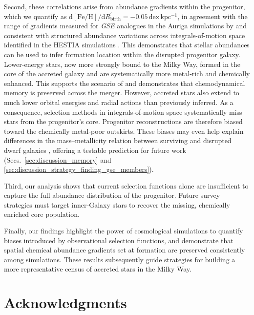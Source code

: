 \documentclass[fleqn,usenatbib]{mnras}
\newcommand{\changed}[1]{{{#1}}}
\begin{document}
Second, these correlations arise from abundance gradients within the progenitor\changed{, which we quantify as
$\mathrm{d[Fe/H]}/\mathrm{d}R_\mathrm{birth}^\prime = -0.05\,\mathrm{dex\,kpc^{-1}}$,
in agreement with the range of gradients measured for \textit{GSE} analogues in the Auriga simulations by \citet{Carrillo2026} and consistent with structured abundance variations across integrals-of-motion space identified in the HESTIA simulations \citet{Khoperskov2023d, Khoperskov2023c}. This demonstrates that stellar abundances can be used to infer formation location within the disrupted progenitor galaxy.} 
Lower-energy stars, now more strongly bound to the Milky Way, formed in the core of the accreted galaxy and are systematically more metal-rich and chemically enhanced. This supports the scenario of \citet{Skuladottir2025} and demonstrates that chemodynamical memory is preserved across the merger. However, accreted stars also extend to much lower orbital energies and radial actions than previously inferred. As a consequence, selection methods in integrals-of-motion space \citep{Helmi2018, Feuillet2021, Monty2024} systematically miss stars from the progenitor’s core. Progenitor reconstructions are therefore biased toward the chemically metal-poor outskirts. These biases may even help explain differences in the mass–metallicity relation between surviving and disrupted dwarf galaxies \citep{Naidu2022}, offering a testable prediction for future work (Secs.~\ref{sec:discussion_memory} and \ref{sec:discussion_strategy_finding_gse_members}).

Third, our analysis shows that current selection functions alone are insufficient to capture the full abundance distribution of the progenitor. Future survey strategies must target inner-Galaxy stars to recover the missing, chemically enriched core population.

Finally, our findings highlight the power of cosmological simulations to quantify biases introduced by observational selection functions, and \changed{demonstrate that spatial chemical abundance gradients set at formation are preserved consistently among simulations. These results subsequently guide} strategies for building a more representative census of accreted stars in the Milky Way.

\section*{Acknowledgments}
\end{document}
